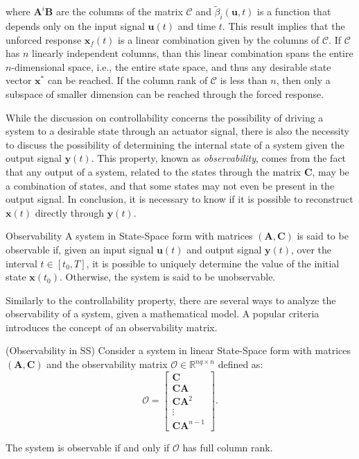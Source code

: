 \documentclass[a4paper,11pt]{book}
\numberwithin{figure}{chapter}
\numberwithin{equation}{chapter}
\numberwithin{table}{chapter}
\newtheorem{theorem}{Theorem}[chapter]
\theoremstyle{definition}
\newtheorem{definition}{Definition}[chapter]
\newcounter{boxed-theorem}
\newenvironment{boxed-theorem}[1]
{\colorlet{shadecolor}{pastelBlue2!10} \begin{shaded} \begin{theorem}{#1}}
{\end{theorem} \end{shaded}}
\newcounter{boxed-definition}
\newenvironment{boxed-definition}[1]
{\colorlet{shadecolor}{pastelYellow!15} \begin{shaded} \begin{definition}{#1}}
{\end{definition} \end{shaded}}
\newcounter{boxed-example}
\begin{document}
\noindent where $\bm{A}^i \bm{B}$ are the columns of the matrix $\bm{\mathcal{C}}$ and $\tilde{\beta}_i(\bm{u}, t)$ is a function that depends only on the input signal $\bm{u}(t)$ and time $t$. This result implies that the unforced response $\bm{x}_f(t)$ is a linear combination given by the columns of $\bm{\mathcal{C}}$. If $\bm{\mathcal{C}}$ has $n$ linearly independent columns, than this linear combination spans the entire $n$-dimensional space, i.e., the entire state space, and thus any desirable state vector $\bm{x}^*$ can be reached. If the column rank of $\bm{\mathcal{C}}$ is less than $n$, then only a subspace of smaller dimension can be reached through the forced response.

While the discussion on controllability concerns the possibility of driving a system to a desirable state through an actuator signal, there is also the necessity to discuss the possibility of determining the internal state of a system given the output signal $\bm{y}(t)$. This property, known as \textit{observability}, comes from the fact that any output of a system, related to the states through the matrix $\bm{C}$, may be a combination of states, and that some states may not even be present in the output signal. In conclusion, it is necessary to know if it is possible to reconstruct $\bm{x}(t)$ directly through $\bm{y}(t)$. 

\begin{boxed-definition}{Observability}
    A system in State-Space form with matrices $(\bm{A}, \bm{C})$ is said to be observable if, given an input signal $\bm{u}(t)$ and output signal $\bm{y}(t)$, over the interval $t \in [t_0, T]$, it is possible to uniquely determine the value of the initial state $\bm{x}(t_0)$. Otherwise, the system is said to be unobservable.
\end{boxed-definition}

Similarly to the controllability property, there are several ways to analyze the observability of a system, given a mathematical model. A popular criteria introduces the concept of an observability matrix.

\begin{boxed-theorem}{(Observability in SS)}
    Consider a system in linear State-Space form with matrices $(\bm{A}, \bm{C})$ and the observability matrix $\bm{\mathcal{O}} \in \mathbb{R}^{nq \times n}$ defined as:
    \begin{equation}
        \bm{\mathcal{O}} = \begin{bmatrix} \bm{C} \\ \bm{C} \bm{A} \\ \bm{C} \bm{A}^2 \\ \vdots \\ \bm{C} \bm{A}^{n-1} \end{bmatrix}
    .\end{equation}
    
    The system is observable if and only if $\bm{\mathcal{O}}$ has full column rank.
\end{boxed-theorem}   
\end{document}
